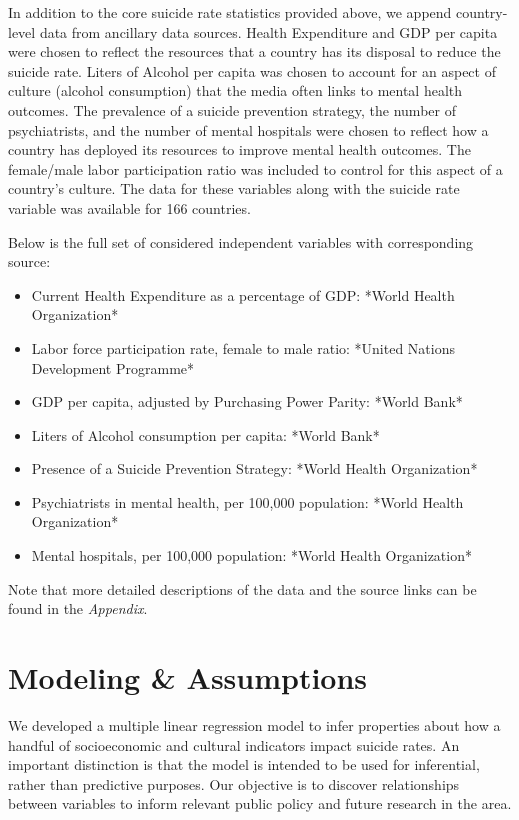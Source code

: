 \documentclass[]{article}
\begin{document}
In addition to the core suicide rate statistics provided above, we
append country-level data from ancillary data sources. Health
Expenditure and GDP per capita were chosen to reflect the resources that
a country has its disposal to reduce the suicide rate. Liters of Alcohol
per capita was chosen to account for an aspect of culture (alcohol
consumption) that the media often links to mental health outcomes. The
prevalence of a suicide prevention strategy, the number of
psychiatrists, and the number of mental hospitals were chosen to reflect
how a country has deployed its resources to improve mental health
outcomes. The female/male labor participation ratio was included to
control for this aspect of a country's culture. The data for these
variables along with the suicide rate variable was available for 166
countries.

Below is the full set of considered independent variables with
corresponding source:

\begin{itemize}
  \item Current Health Expenditure as a percentage of GDP: *World Health Organization*  
  \item Labor force participation rate, female to male ratio: *United Nations Development Programme*
  \item GDP per capita, adjusted by Purchasing Power Parity: *World Bank*
  \item Liters of Alcohol consumption per capita: *World Bank*
  \item Presence of a Suicide Prevention Strategy: *World Health Organization*
  \item Psychiatrists in mental health, per 100,000 population: *World Health Organization*
  \item Mental hospitals, per 100,000 population: *World Health Organization*
\end{itemize}

Note that more detailed descriptions of the data and the source links
can be found in the \emph{Appendix}.

\section{Modeling \& Assumptions}\label{modeling-assumptions}

We developed a multiple linear regression model to infer properties
about how a handful of socioeconomic and cultural indicators impact
suicide rates. An important distinction is that the model is intended to
be used for inferential, rather than predictive purposes. Our objective
is to discover relationships between variables to inform relevant public
policy and future research in the area.
\end{document}
